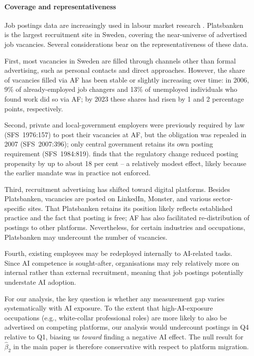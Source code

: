 \documentclass[preprint,12pt,authoryear]{elsarticle}
\begin{document}
\paragraph{Coverage and representativeness}
Job postings data are increasingly used in labour market research \citep[e.g.][]{engberg2024daioe}. Platsbanken is the largest recruitment site in Sweden, covering the near-universe of advertised job vacancies. Several considerations bear on the representativeness of these data.

First, most vacancies in Sweden are filled through channels other than formal advertising, such as personal contacts and direct approaches. However, the share of vacancies filled via AF has been stable or slightly increasing over time: in 2006, 9\% of already-employed job changers and 13\% of unemployed individuals who found work did so via AF; by 2023 these shares had risen by 1 and 2 percentage points, respectively.

Second, private and local-government employers were previously required by law (SFS~1976:157) to post their vacancies at AF, but the obligation was repealed in 2007 (SFS~2007:396); only central government retains its own posting requirement (SFS~1984:819). \citet{cronert2021regulatory} finds that the regulatory change reduced posting propensity by up to about 18 per cent -- a relatively modest effect, likely because the earlier mandate was in practice not enforced.

Third, recruitment advertising has shifted toward digital platforms. Besides Platsbanken, vacancies are posted on LinkedIn, Monster, and various sector-specific sites. That Platsbanken retains its position likely reflects established practice and the fact that posting is free; AF has also facilitated re-distribution of postings to other platforms. Nevertheless, for certain industries and occupations, Platsbanken may undercount the number of vacancies.

Fourth, existing employees may be redeployed internally to AI-related tasks. Since AI competence is sought-after, organisations may rely relatively more on internal rather than external recruitment, meaning that job postings potentially understate AI adoption.

For our analysis, the key question is whether any measurement gap varies systematically with AI exposure. To the extent that high-AI-exposure occupations (e.g., white-collar professional roles) are more likely to also be advertised on competing platforms, our analysis would undercount postings in Q4 relative to Q1, biasing us \emph{toward} finding a negative AI effect. The null result for $\hat\beta_2$ in the main paper is therefore conservative with respect to platform migration.
\end{document}
